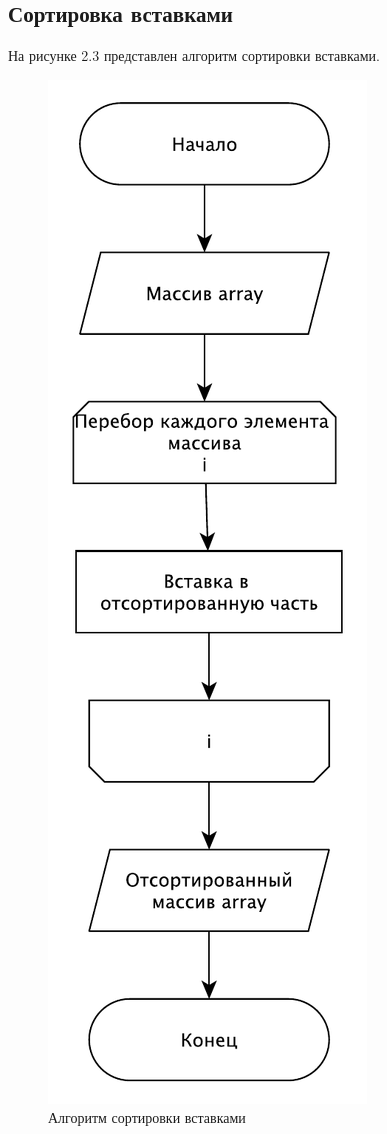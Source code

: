 \subsection{Сортировка вставками}
На рисунке 2.3 представлен алгоритм сортировки вставками.
\begin{figure}[H]
\centering
\includegraphics[scale=0.8]{./pictures/shema2.pdf}
\caption{Алгоритм сортировки вставками}
\end{figure}
\newpage
